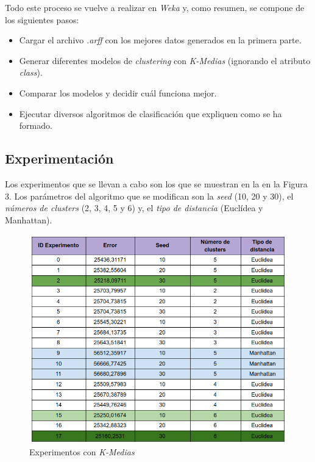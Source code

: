 \documentclass[12pt,a4paper, xcolor=table]{article}
\begin{document}
\vspace{2mm}

Todo este proceso se vuelve a realizar en \textit{Weka} y, como resumen, se compone de los siguientes pasos:

\vspace{1mm}

\begin{itemize}
    \item Cargar el archivo \textit{.arff} con los mejores datos generados en la primera parte.
    \item Generar diferentes modelos de \textit{clustering} con \textit{K-Medias} (ignorando el atributo \textit{class}).
    \item Comparar los modelos y decidir cuál funciona mejor.
    \item Ejecutar diversos algoritmos de clasificación que expliquen como se ha formado.
\end{itemize}


\subsection{Experimentación}

Los experimentos que se llevan a cabo son los que se muestran en la en la Figura 3. Los parámetros del algoritmo que se modifican son la \textit{seed} (10, 20 y 30), el \textit{números de clusters} (2, 3, 4, 5 y 6) y, el \textit{tipo de distancia} (Euclídea y Manhattan).

\begin{figure}[!h]
  \centering
  \includegraphics[width=13cm]{img/experimentos.png}
  \caption{Experimentos con \textit{K-Medias}}
\end{figure}
\end{document}
